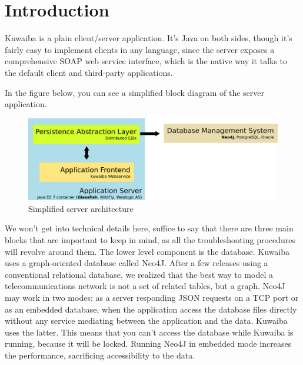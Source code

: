 \documentclass[a4paper]{article}
\begin{document}
	\newpage
	\section{Introduction}
		Kuwaiba is a plain client/server application. It's Java on both sides, though it's fairly easy to implement clients in any language, since the server exposes a comprehensive SOAP web service interface, which is the native way it talks to the default client and third-party applications. 
		
		In the figure below, you can see a simplified block diagram of the server application.
		\begin{figure}[h!] %
			\includegraphics[width=\linewidth]{img/block-diagram.png}
			\caption{Simplified server architecture}
		\end{figure}
		
		We won't get into technical details here, suffice to say that there are three main blocks that are important to keep in mind, as all the troubleshooting procedures will revolve around them. The lower level component is the database. Kuwaiba uses a graph-oriented database called Neo4J. After a few releases using a conventional relational database, we realized that the best way to model a telecommunications network is not a set of related tables, but a graph. Neo4J may work in two modes: as a server responding JSON requests on a TCP port or as an embedded database, when the application access the database files directly without any service mediating between the application and the data. Kuwaiba uses the latter. This means that you can't access the database while Kuwaiba is running, because it will be locked. Running Neo4J in embedded mode increases the performance, sacrificing accessibility to the data.\newline
		
\end{document}
